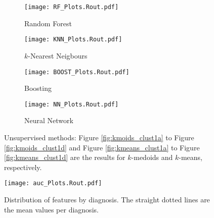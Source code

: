 \clearpage
\noindent\begin{figure}[H]
    \centering
    \begin{subfigure}[b]{0.4\textwidth}
        \texttt{[image: RF\_Plots.Rout.pdf]}
        \caption{\small{Random Forest}}\label{fig:rf_cv}
    \end{subfigure}
    \begin{subfigure}[b]{0.4\textwidth}
        \texttt{[image: KNN\_Plots.Rout.pdf]}
        \caption{\small{$k$-Nearest Neigbours}}\label{fig:knn_cv}
    \end{subfigure}
    
    \begin{subfigure}[b]{0.4\textwidth}
        \texttt{[image: BOOST\_Plots.Rout.pdf]}
        \caption{\small{Boosting}}\label{fig:boost_cv}
    \end{subfigure}
    \begin{subfigure}[b]{0.4\textwidth}
        \texttt{[image: NN\_Plots.Rout.pdf]}
        \caption{\small{Neural Network}}\label{fig:nn_cv}
    \end{subfigure}
    \caption{\small{Unsupervised methods: Figure \ref{fig:kmoids_clust1a} to Figure \ref{fig:kmoids_clust1d} and Figure \ref{fig:kmeans_clust1a} to Figure \ref{fig:kmeans_clust1d} are the results for $k$-medoids and $k$-means, respectively.}}\label{fig:cv_results}
\end{figure}

\noindent\begin{figure}[H]
    \centering
    \texttt{[image: auc\_Plots.Rout.pdf]}\vspace{-0.3cm}
    \caption{\small{Distribution of features by diagnosis. The straight dotted lines are the mean values per diagnosis.}}\label{fig:auc_resamples}
\end{figure}

\vspace*{-10pt}
\begin{table}[H]
\centering
\caption{\small{Variables description and summary}}\vspace{-0.1cm}
\end{table}
\vspace*{-12pt}

